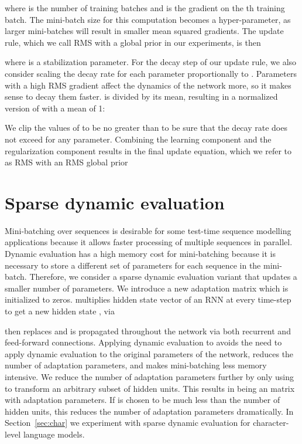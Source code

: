 \documentclass{article} \usepackage{iclr2018_conference,times}
\begin{document}
where  is the number of training batches and  is the gradient on the th training batch. The mini-batch size for this computation becomes a hyper-parameter, as larger mini-batches will result in smaller mean squared gradients. The update rule, which we call RMS with a global prior in our experiments, is then

where  is a stabilization parameter. For the decay step of our update rule, we also consider scaling the decay rate for each parameter proportionally to . Parameters with a high RMS gradient affect the dynamics of the network more, so it makes sense to decay them faster.  is  divided by its mean, resulting in a normalized version of  with a mean of 1:

We clip the values of  to be no greater than  to be sure that the decay rate does not exceed  for any parameter. Combining the learning component and the regularization component results in the final update equation, which we refer to as RMS with an RMS global prior




\section{Sparse dynamic evaluation}
\label{sec:mem}


Mini-batching over sequences is desirable for some test-time sequence modelling applications because it allows faster processing of multiple sequences in parallel. Dynamic evaluation has a high memory cost for mini-batching because it is necessary to store a different set of parameters for each sequence in the mini-batch. Therefore, we consider a sparse dynamic evaluation variant that updates a smaller number of parameters. We introduce a new adaptation matrix  which is initialized to zeros.  multiplies hidden state vector  of an RNN at every time-step to get a new hidden state , via

 then replaces  and is propagated throughout the network via both recurrent and feed-forward connections. Applying dynamic evaluation to  avoids the need to apply dynamic evaluation to the original parameters of the network, reduces the number of adaptation parameters, and makes mini-batching less memory intensive. We reduce the number of adaptation parameters further by only using  to transform an arbitrary subset of  hidden units. This results in  being an  matrix with  adaptation parameters. If  is chosen to be much less than the number of hidden units, this reduces the number of adaptation parameters dramatically. In Section~\ref{sec:char} we experiment with sparse dynamic evaluation for character-level language models.
\end{document}
